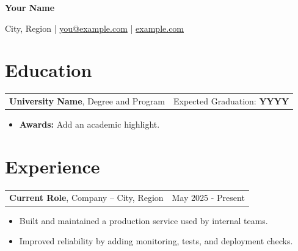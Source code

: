 \documentclass[10pt,letterpaper]{article}
\newenvironment{onecolentry}{}{}
\newenvironment{twocolentry}[1]{
    \def\rightcolumn{#1}
    \begin{tabularx}{\textwidth}{Xr}
}{
    & \rightcolumn
    \end{tabularx}
}
\begin{document}
    \begin{center}
        {\fontsize{24pt}{24pt}\selectfont\textbf{Your Name}}

        \vspace{0.2cm}

        City, Region | \href{mailto:you@example.com}{you@example.com} | \href{https://example.com}{example.com}
    \end{center}

    \vspace{0.10 cm}
    \section{Education}

    \begin{twocolentry}{Expected Graduation: \textbf{YYYY}}
        \textbf{University Name}, Degree and Program
    \end{twocolentry}

    \vspace{0.10 cm}
    \begin{onecolentry}
        \begin{itemize}[leftmargin=2em, itemsep=1pt, parsep=0pt, topsep=0pt, partopsep=0pt]
            \item \textbf{Awards:} Add an academic highlight.
        \end{itemize}
    \end{onecolentry}

    \vspace{0.10 cm}
    \section{Experience}

    \begin{twocolentry}{May 2025 - Present}
        \textbf{Current Role}, Company -- City, Region
    \end{twocolentry}

    \vspace{0.10 cm}
    \begin{onecolentry}
        \begin{itemize}[leftmargin=2em, itemsep=1pt, parsep=0pt, topsep=0pt, partopsep=0pt]
            \item Built and maintained a production service used by internal teams.
            \item Improved reliability by adding monitoring, tests, and deployment checks.
        \end{itemize}
    \end{onecolentry}
\end{document}
